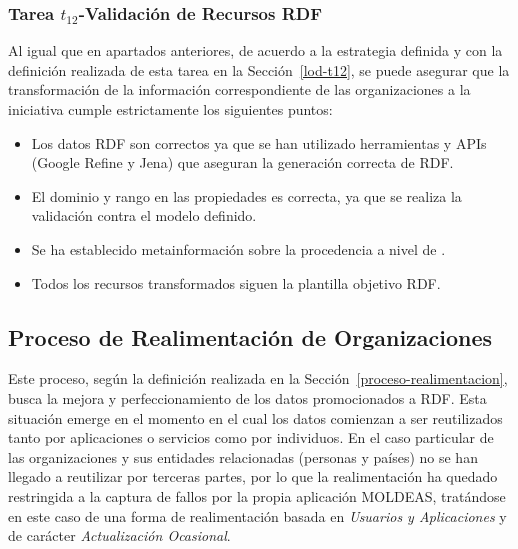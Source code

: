 \subsubsection{Tarea $t_{12}$-Validación de Recursos RDF}
Al igual que en apartados anteriores, de acuerdo a la estrategia definida y con la definición realizada de esta tarea en la Sección~\ref{lod-t12}, 
se puede asegurar que la transformación de la información correspondiente de las organizaciones a la iniciativa \linkeddata cumple estrictamente los 
siguientes puntos:

\begin{itemize}
 \item Los datos \gls{RDF} son correctos ya que se han utilizado herramientas y \gls{API}s (Google \gls{Refine} y Jena) que aseguran 
la generación correcta de RDF.
 \item El dominio y rango en las propiedades es correcta, ya que se realiza la validación contra el modelo definido.
 \item Se ha establecido metainformación sobre la procedencia a nivel de \dataset.
 \item Todos los recursos transformados siguen la plantilla objetivo RDF.
\end{itemize}

\subsection{Proceso de Realimentación de Organizaciones}
Este proceso, según la definición realizada en la Sección~\ref{proceso-realimentacion}, busca la mejora 
y perfeccionamiento de los datos promocionados a RDF. Esta situación emerge en el momento en el cual 
los datos comienzan a ser reutilizados tanto por aplicaciones o servicios como por individuos. En el caso 
particular de las organizaciones y sus entidades relacionadas (personas y países) no se han llegado 
a reutilizar por terceras partes, por lo que la realimentación ha quedado restringida a la captura 
de fallos por la propia aplicación \gls{MOLDEAS}, tratándose en este caso de una forma de realimentación 
basada en \textit{Usuarios y Aplicaciones} y de carácter \textit{Actualización Ocasional}.


